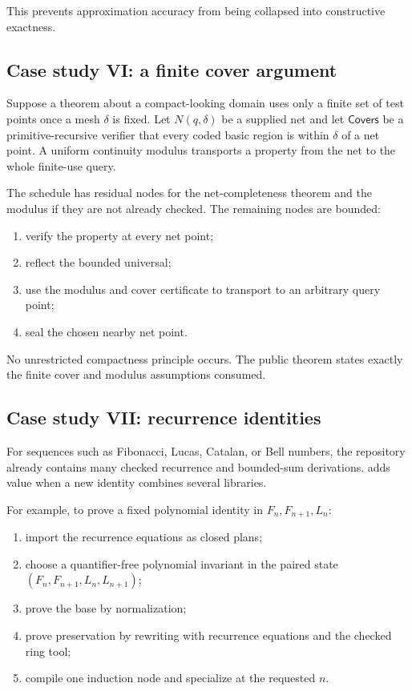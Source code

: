 This prevents approximation accuracy from being collapsed into constructive exactness.

\subsection{Case study VI: a finite cover argument}

Suppose a theorem about a compact-looking domain uses only a finite set of test points once a mesh
\(\delta\) is fixed.  Let \(N(q,\delta)\) be a supplied net and let \(\mathsf{Covers}\) be a
primitive-recursive verifier that every coded basic region is within \(\delta\) of a net point.  A
uniform continuity modulus transports a property from the net to the whole finite-use query.

The schedule has residual nodes for the net-completeness theorem and the modulus if they are not
already checked.  The remaining nodes are bounded:

\begin{enumerate}
\item verify the property at every net point;
\item reflect the bounded universal;
\item use the modulus and cover certificate to transport to an arbitrary query point;
\item seal the chosen nearby net point.
\end{enumerate}

No unrestricted compactness principle occurs.  The public theorem states exactly the finite cover and
modulus assumptions consumed.

\subsection{Case study VII: recurrence identities}

For sequences such as Fibonacci, Lucas, Catalan, or Bell numbers, the repository already contains
many checked recurrence and bounded-sum derivations.  \TAPIR{} adds value when a new identity combines
several libraries.

For example, to prove a fixed polynomial identity in \(F_n,F_{n+1},L_n\):

\begin{enumerate}
\item import the recurrence equations as closed plans;
\item choose a quantifier-free polynomial invariant in the paired state
      \((F_n,F_{n+1},L_n,L_{n+1})\);
\item prove the base by normalization;
\item prove preservation by rewriting with recurrence equations and the checked ring tool;
\item compile one induction node and specialize at the requested \(n\).
\end{enumerate}

